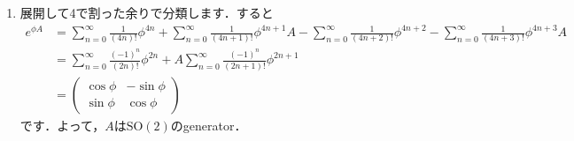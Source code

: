 \documentclass[a4paper,pdflatex,ja=standard]{bxjsarticle}
\begin{document}
\begin{enumerate}
  \item 
  展開して4で割った余りで分類します．すると
  \begin{align}
    e^{\phi A}
    &=
    \sum_{n=0}^{\infty}
    \frac{1}{(4n)!}\phi^{4n}
    +
    \sum_{n=0}^{\infty}
    \frac{1}{(4n+1)!}\phi^{4n+1}A
    -
    \sum_{n=0}^{\infty}
    \frac{1}{(4n+2)!}\phi^{4n+2}
    -
    \sum_{n=0}^{\infty}
    \frac{1}{(4n+3)!}\phi^{4n+3}A
    \nonumber
    \\
    &=
    \sum_{n=0}^{\infty}
    \frac{(-1)^n}{(2n)!}\phi^{2n}
    +
    A
    \sum_{n=0}^{\infty}
    \frac{(-1)^n}{(2n+1)!}\phi^{2n+1}
    \nonumber
    \\
    &=
    \begin{pmatrix}
      \cos\phi & -\sin\phi \\
      \sin\phi & \cos\phi
    \end{pmatrix}
  \end{align}
  です．よって，$A$は$\text{SO}(2)$のgenerator．


\end{enumerate}
\end{document}
